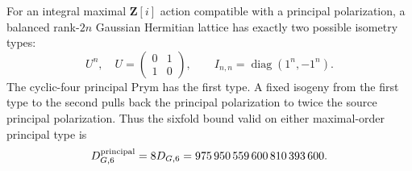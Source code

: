 \begin{proposition}
\label{SF-05}
For an integral maximal $\mathbf Z[i]$ action compatible with a
principal polarization, a balanced rank-$2n$ Gaussian Hermitian
lattice has exactly two possible isometry types:
\[
 U^n,\quad U=\begin{pmatrix}0&1\\1&0\end{pmatrix},
 \qquad I_{n,n}=\operatorname{diag}(1^n,-1^n).
\]
The cyclic-four principal Prym has the first type. A fixed isogeny
from the first type to the second pulls back the principal
polarization to twice the source principal polarization. Thus the
sixfold bound valid on either maximal-order principal type is
\[
 D_{G,6}^{\rm principal}=8D_{G,6}
 =975\,950\,559\,600\,810\,393\,600.
\]
\end{proposition}
